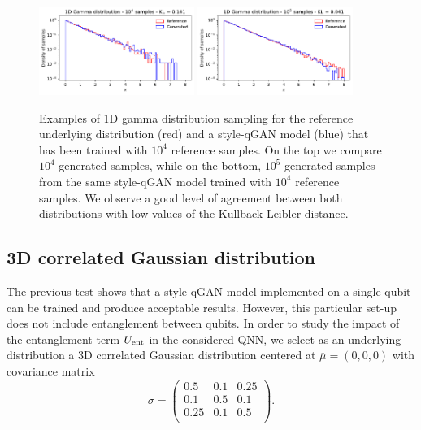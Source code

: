 \documentclass[twocolumn,preprintnumbers,superscriptaddress]{revtex4-2}
\begin{document}
\begin{figure}
  \includegraphics[width=0.45\textwidth]{plots/1Dgamma/1Dgamma_distribution_10k.pdf}
  \includegraphics[width=0.45\textwidth]{plots/1Dgamma/1Dgamma_distribution_100k.pdf}
  \caption{\label{fig:gamma} Examples of 1D gamma distribution sampling for the
  reference underlying distribution (red) and a style-qGAN model (blue) that has been
  trained with $10^4$ reference samples. On the top we compare $10^4$ generated samples, while
  on the bottom, $10^5$ generated samples from the same style-qGAN model
  trained with $10^4$ reference samples. We observe a good level of agreement between both
  distributions with low values of the Kullback-Leibler distance.}
\end{figure}

\subsection{3D correlated Gaussian distribution}

The previous test shows that a style-qGAN model implemented on a single qubit can be
trained and produce acceptable results. However, this particular set-up does not
include entanglement between qubits. In order to study the impact of the
entanglement term $U_{\rm ent}$ in the considered QNN, we select as an
underlying distribution a 3D correlated Gaussian distribution centered at
$\overline{\mu}=(0,0,0)$ with covariance matrix
\begin{equation}
\label{eq:covmat}
  \sigma =
\begin{pmatrix}
  0.5 & 0.1 & 0.25\\
  0.1 & 0.5 & 0.1\\
  0.25 & 0.1 & 0.5\\
  \end{pmatrix}.
\end{equation}
\end{document}
